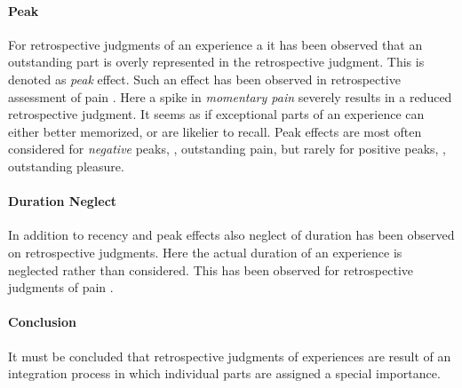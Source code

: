 \paragraph*{Peak}
For retrospective judgments of an experience a it has been observed that an outstanding part is overly represented in the retrospective judgment.
This is denoted as \emph{peak} effect.
Such an effect has been observed in retrospective assessment of pain \citep[\cf,][]{kahneman_when_1993, redelmeier_patients_1996}.
Here a spike in \emph{momentary pain} severely results in a reduced retrospective judgment.
It seems as if exceptional parts of an experience can either better memorized, or are likelier to recall.
Peak effects are most often considered for \emph{negative} peaks, \eg, outstanding pain, but rarely for positive peaks, \eg, outstanding pleasure.

\paragraph*{Duration Neglect}
In addition to recency and peak effects also neglect of duration has been observed on retrospective judgments.
Here the actual duration of an experience is neglected rather than considered.
This has been observed for retrospective judgments of pain \citep[\cf,][]{fredrickson_duration_1993, ariely_combining_1998}.

\paragraph*{Conclusion}
It must be concluded that retrospective judgments of experiences are result of an integration process in which individual parts are assigned a special importance.
